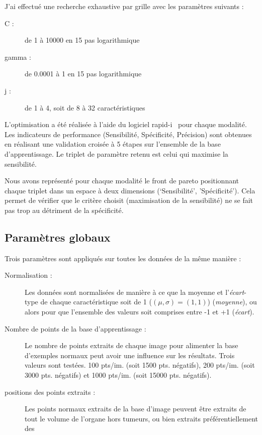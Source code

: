 J'ai effectué une recherche exhaustive par grille avec les paramètres suivants :

\begin{description}
 \item [C :] de 1 à 10000 en 15 pas logarithmique
 \item [gamma :] de 0.0001 à 1 en 15 pas logarithmique
 \item [j :] de 1 à 4, soit de 8 à 32 caractéristiques
\end{description}

L'optimisation a été réalisée à l'aide du logiciel rapid-i~\cite{mierswa2006} pour chaque modalité. Les indicateurs de performance (Sensibilité, Spécificité, Précision) sont obtenues en réalisant une validation croisée à 5 étapes sur l'ensemble de la base d'apprentissage. Le triplet de paramètre retenu est celui qui maximise la sensibilité.

Nous avons représenté pour chaque modalité le front de pareto positionnant chaque triplet dans un espace à deux dimensions (`Sensibilité', 'Spécificité'). Cela permet de vérifier que le critère choisit (maximisation de la sensibilité) ne se fait pas trop au détriment de la spécificité.

\subsection{Paramètres globaux}

Trois paramètres sont appliqués sur toutes les données de la même manière :
\begin{description}
 \item[Normalisation :] Les données sont normalisées de manière à ce que la moyenne et l'\emph{écart}-type de chaque caractéristique soit de 1 ($(\mu, \sigma)=(1,1)$) (\emph{moyenne}), ou alors pour que l'ensemble des valeurs soit comprises entre -1 et +1 (\emph{écart}).
 \item[Nombre de points de la base d'apprentissage :] Le nombre de points extraits de chaque image pour alimenter la base d'exemples normaux peut avoir une influence sur les résultats. Trois valeurs sont testées. 100 pts/im. (soit 1500 pts. négatifs), 200 pts/im. (soit 3000 pts. négatifs) et 1000 pts/im. (soit 15000 pts. négatifs).
 \item[positions des points extraits :] Les points normaux extraits de la base d'image peuvent être extraits de tout le volume de l'organe hors tumeurs, ou bien extraits préférentiellement des 
\end{description}

